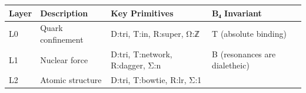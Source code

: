 \begin{longtable}[]{@{}llll@{}}
\toprule
\begin{minipage}[b]{0.13\columnwidth}\raggedright
Layer\strut
\end{minipage} & \begin{minipage}[b]{0.23\columnwidth}\raggedright
Description\strut
\end{minipage} & \begin{minipage}[b]{0.27\columnwidth}\raggedright
Key Primitives\strut
\end{minipage} & \begin{minipage}[b]{0.25\columnwidth}\raggedright
B₄ Invariant\strut
\end{minipage}\tabularnewline
\midrule
\endhead
\begin{minipage}[t]{0.13\columnwidth}\raggedright
L0\strut
\end{minipage} & \begin{minipage}[t]{0.23\columnwidth}\raggedright
Quark confinement\strut
\end{minipage} & \begin{minipage}[t]{0.27\columnwidth}\raggedright
D:tri, T:in, R:super, Ω:ℤ\strut
\end{minipage} & \begin{minipage}[t]{0.25\columnwidth}\raggedright
T (absolute binding)\strut
\end{minipage}\tabularnewline
\begin{minipage}[t]{0.13\columnwidth}\raggedright
L1\strut
\end{minipage} & \begin{minipage}[t]{0.23\columnwidth}\raggedright
Nuclear force\strut
\end{minipage} & \begin{minipage}[t]{0.27\columnwidth}\raggedright
D:tri, T:network, R:dagger, Σ:n\strut
\end{minipage} & \begin{minipage}[t]{0.25\columnwidth}\raggedright
B (resonances are dialetheic)\strut
\end{minipage}\tabularnewline
\begin{minipage}[t]{0.13\columnwidth}\raggedright
L2\strut
\end{minipage} & \begin{minipage}[t]{0.23\columnwidth}\raggedright
Atomic structure\strut
\end{minipage} & \begin{minipage}[t]{0.27\columnwidth}\raggedright
D:tri, T:bowtie, R:lr, Σ:1\strut

\end{minipage}
\end{longtable}
